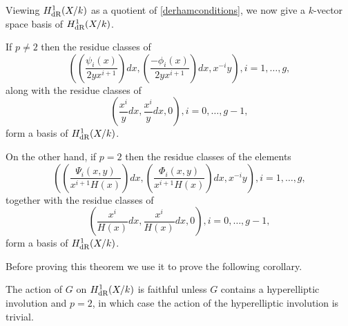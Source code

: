 Viewing $H_{\text {dR}}^1(X/k)$ as a quotient of \eqref{derhamconditions}, we now give a $k$-vector space basis of $H_{\text {dR}}^1(X/k)$.

    \begin{thm}\label{basis}
    If $p \neq 2$ then the residue classes of 
        \begin{equation}\label{one}
         \left( \left( \frac{\psi_i(x)}{2yx^{i+1}}\right) dx, \left(\frac{-\phi_i(x)}{2yx^{i+1}}\right) dx, x^{-i}y\right), i=1, \ldots ,g,
        \end{equation}
    along with the residue classes of 
        \begin{equation}\label{two}
         \left( \frac{x^{i}}{y} dx , \frac{x^{i}}{y} dx, 0 \right), i = 0,\ldots ,g-1,
        \end{equation}
    form a basis of $H_{\text {dR}}^1(X/k)$.
    
    On the other hand, if $p=2$ then the residue classes of the elements 
        \begin{equation}\label{three}
        \left( \left(\frac{\Psi_i(x,y)}{x^{i+1}H(x)}\right) dx, \left( \frac{\Phi_i(x,y)}{x^{i+1}H(x)} \right) dx, x^{-i}y \right), i =1, \ldots , g,
        \end{equation}
    together with the residue classes of 
        \begin{equation}\label{four}
        \left( \frac{x^{i}}{H(x)} dx, \frac{x^{i}}{H(x)} dx, 0 \right), i=0, \ldots, g-1,
        \end{equation}
    form a basis of $H_{\text {dR}}^1(X/k)$.
    \end{thm}

Before proving this theorem we use it to prove the following corollary.

    \begin{cor}
    The action of $G$ on $H_{\text {dR}}^1(X/k)$ is faithful unless $G$ contains a hyperelliptic involution and $p=2$, in which case the action of the hyperelliptic involution is trivial.
    \end{cor}

